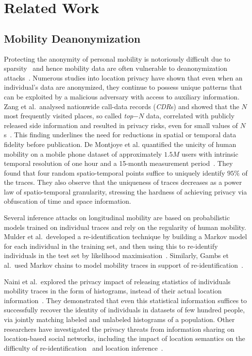 \section{Related Work}


\subsection{Mobility Deanonymization}

Protecting the anonymity of personal mobility is notoriously difficult due to sparsity~\citep{aggarwal2008} and hence mobility data are often vulnerable to deanonymization attacks~\citep{Narayanan2008}.
Numerous studies into location privacy have shown that even when an individual's data are anonymized, they continue to possess unique patterns that can be exploited by a malicious adversary with access to auxiliary information.
Zang et al.\ analysed nationwide call-data records (\emph{CDR}s) and showed that the $N$ most frequently visited places, so called \emph{top$-N$} data, correlated with publicly released side information and resulted in privacy risks, even for small values of $N$s~\citep{Zang2011}.
This finding underlines the need for reductions in spatial or temporal data fidelity before publication.
De Montjoye et al. quantified the unicity of human mobility on a mobile phone dataset of approximately $1.5M$ users with intrinsic temporal resolution of one hour and a 15-month measurement period~\citep{DeMontjoye2013}.
They found that four random spatio-temporal points suffice to uniquely identify $ 95\% $ of the traces.
They also observe that the uniqueness of traces decreases as a power law of spatio-temporal granularity, stressing the hardness of achieving privacy via obfuscation of time and space information.

Several inference attacks on longitudinal mobility are based on probabilistic models trained on individual traces and rely on the regularity of human mobility.
Mulder et al.\ developed a re-identification technique by building a Markov model for each individual in the training set, and then using this to re-identify individuals in the test set by likelihood maximisation~\cite{deMulder08}.
Similarly, Gambs et al.\ used Markov chains to model mobility traces in support of re-identification~\cite{Gambs2014}.

Naini et al.\ explored the privacy impact of releasing statistics of individuals mobility traces in the form of histograms, instead of their actual location information~\cite{Naini2016a}. They demonstrated that even this statistical information suffices to successfully recover the identity of individuals in datasets of few hundred people, via jointly matching labeled and unlabeled histograms of a population.
Other researchers have investigated the privacy threats from information sharing on location-based social networks, including the impact of location semantics on the difficulty of re-identification~\cite{privacyAndTheCity} and location inference~\cite{Agir}.

